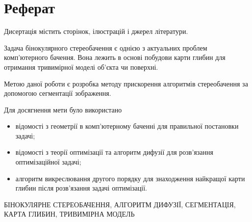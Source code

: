 \chapter*{Реферат}

Дисертація містить \pageref{LastPage} сторінок,
 ілюстрацій і
 джерел літератури.

Задача бінокулярного стереобачення є
однією з актуальних проблем комп'ютерного бачення.
Вона лежить в основі побудови карти глибин
для отримання тривимірної моделі об'єкта чи поверхні.

Метою даної роботи є розробка методу прискорення алгоритмів стереобачення
за допомогою сегментації зображення.

Для досягнення мети було використано
\begin{itemize}
  \item відомості з геометрії в комп'ютерному баченні
        для правильної постановки задачі;
  \item відомості з теорії оптимізації та
        алгоритм дифузії для розв'язання оптимізаційної задачі;
  \item алгоритм викреслювання другого порядку для знаходження
        найкращої карти глибин після розв'язання задачі оптимізації.
\end{itemize}

\MakeUppercase{бінокулярне стереобачення,
               алгоритм дифузії,
               сегментація,
               карта глибин,
               тривимірна модель}
